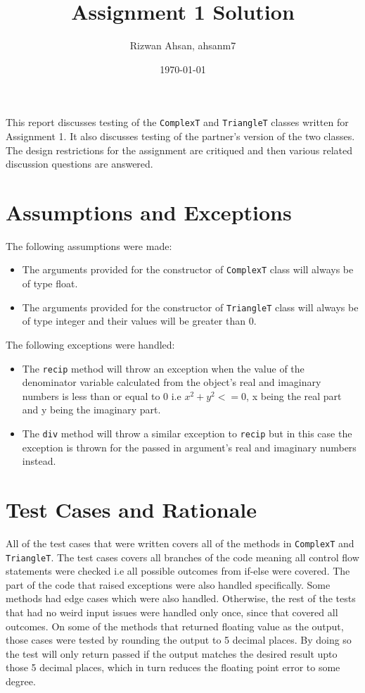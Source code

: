 \documentclass[12pt]{article}
\title{Assignment 1 Solution}
\author{Rizwan Ahsan, ahsanm7}
\date{\today}
\begin{document}
\maketitle

This report discusses testing of the \verb|ComplexT| and \verb|TriangleT|
classes written for Assignment 1. It also discusses testing of the partner's
version of the two classes. The design restrictions for the assignment
are critiqued and then various related discussion questions are answered.

\section{Assumptions and Exceptions} \label{AssumptAndExcept}
The following assumptions were made:
\begin{itemize}
	\item The arguments provided for the constructor of \verb|ComplexT| class will always be of 
	type float.
	\item The arguments provided for the constructor of \verb|TriangleT| class will always be of type integer and their values will be greater than 0.
\end{itemize}
The following exceptions were handled:
\begin{itemize}
	\item The \verb|recip| method will throw an exception when the value of the denominator variable calculated from the object's real and imaginary numbers is less than or equal 
	to 0 i.e \(x^2 + y^2 <= 0\), x being the real part and y being the imaginary part.
	\item The \verb|div| method will throw a similar exception to \verb|recip| but in this case
	the exception is thrown for the passed in argument's real and imaginary numbers instead.
\end{itemize}


\section{Test Cases and Rationale} \label{Testing}
All of the test cases that were written covers all of the methods in \verb|ComplexT| and 
\verb|TriangleT|. The test cases covers all branches of the code meaning all control flow statements were checked i.e all possible outcomes from if-else were covered. The part of
the code that raised exceptions were also handled specifically. Some methods had edge cases which 
were also handled. Otherwise, the rest of the tests that had no weird input issues were 
handled only once, since that covered all outcomes. On some of the methods that returned
floating value as the output, those cases were tested by rounding the output to 5 decimal places.
By doing so the test will only return passed if the output matches the desired result upto those 5 decimal places, which in turn reduces the floating point error to some degree.
\end{document}
